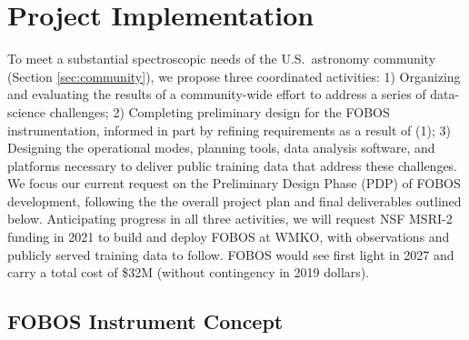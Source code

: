 \documentclass[oneside,11pt]{amsart}
\newcommand{\comment}[2][todo]{{\color{#1}[[{\bf #2}]]}}
\begin{document}
\section{Project Implementation}
\label{sec:project}

To meet a substantial spectroscopic needs of the U.S.\ astronomy
community (Section \ref{sec:community}), we propose three coordinated
activities: 1) Organizing and evaluating the results of a community-wide
effort to address a series of data-science challenges; 2) Completing
preliminary design for the FOBOS instrumentation, informed in part by
refining requirements as a result of (1); 3) Designing the operational
modes, planning tools, data analysis software, and platforms necessary
to deliver public training data that address these challenges.  We focus
our current request on the Preliminary Design Phase (PDP) of FOBOS
development, following the the overall project plan and final
deliverables outlined below.  Anticipating progress in all three
activities, we will request NSF MSRI-2 funding in 2021 to build and
deploy FOBOS at WMKO, with observations and publicly served training
data to follow.  FOBOS would see first light in 2027 and carry a total
cost of \$32M (without contingency in 2019 dollars).

\subsection{FOBOS Instrument Concept}
\label{sec:concept}

\end{document}

